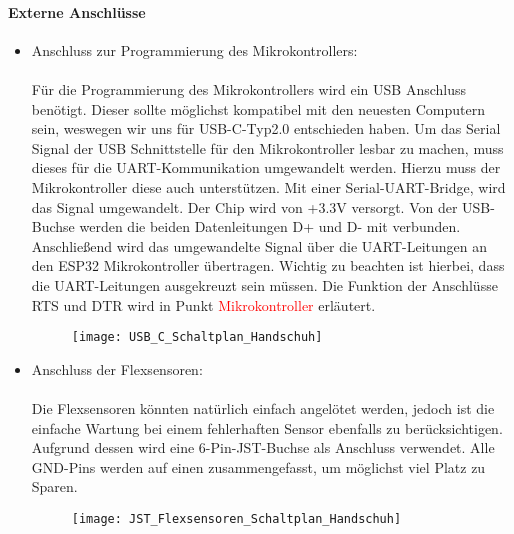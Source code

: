 \documentclass[titlepage,12pt,twoside]{article}
\begin{document}
\paragraph{Externe Anschlüsse}
\hfill \break
\hfill \break
\begin{itemize}
	\item Anschluss zur Programmierung des Mikrokontrollers: \\
		  \\
		  Für die Programmierung des Mikrokontrollers wird ein USB Anschluss benötigt. Dieser sollte möglichst kompatibel mit
		  den neuesten Computern sein, weswegen wir uns für USB-C-Typ2.0 entschieden haben. Um das Serial Signal der USB Schnittstelle
		  für den Mikrokontroller lesbar zu machen, muss dieses für die UART-Kommunikation umgewandelt werden. Hierzu muss der Mikrokontroller
		  diese auch unterstützen. Mit einer Serial-UART-Bridge, wird das Signal umgewandelt. Der Chip wird von +3.3V versorgt.
		  Von der USB-Buchse werden die beiden Datenleitungen D+ und D- mit verbunden. Anschließend wird das umgewandelte Signal 
		  über die UART-Leitungen an den ESP32 Mikrokontroller übertragen. Wichtig zu beachten ist hierbei, dass die UART-Leitungen
		  ausgekreuzt sein müssen. Die Funktion der Anschlüsse RTS und DTR wird in Punkt \textcolor{red}{Mikrokontroller} erläutert. \\
		  \begin{figure}[H]
			\begin{center}
				\scalebox{0.5}
				{\texttt{[image: USB\_C\_Schaltplan\_Handschuh]}}
			\end{center}
		\end{figure}
	\item Anschluss der Flexsensoren: \\
		  \\
		  Die Flexsensoren könnten natürlich einfach angelötet werden, jedoch ist die einfache Wartung bei einem fehlerhaften
		  Sensor ebenfalls zu berücksichtigen. Aufgrund dessen wird eine 6-Pin-JST-Buchse als Anschluss verwendet. Alle GND-Pins
		  werden auf einen zusammengefasst, um möglichst viel Platz zu Sparen. \\
		  \begin{figure}[H]
			\begin{center}
				\scalebox{0.5}
				{\texttt{[image: JST\_Flexsensoren\_Schaltplan\_Handschuh]}}
			\end{center}
		\end{figure}

\end{itemize}
\end{document}
